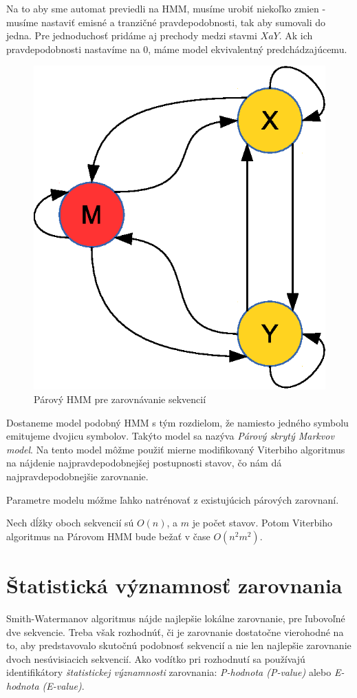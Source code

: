 Na to aby sme automat previedli na HMM, musíme urobiť niekoľko zmien - musíme nastaviť emisné a tranzičné pravdepodobnosti, tak aby sumovali do jedna. Pre jednoduchosť pridáme aj prechody medzi stavmi $X a Y$. Ak ich pravdepodobnosti nastavíme na 0, máme model ekvivalentný predchádzajúcemu.

\begin{figure}[htp]
    \centering
    \includegraphics[width=.4\textwidth]{images/simple_model}
    \caption{Párový HMM pre zarovnávanie sekvencií}
    \label{fig:simple-model}
\end{figure}

Dostaneme model podobný HMM s tým rozdielom, že namiesto jedného symbolu emitujeme dvojicu symbolov. Takýto model sa nazýva \textit{Párový skrytý Markvov model}. Na tento model môžme použiť mierne modifikovaný Viterbiho algoritmus na nájdenie najpravdepodobnejšej postupnosti stavov, čo nám dá najpravdepodobnejšie zarovnanie.

Parametre modelu móžme ľahko natrénovať z existujúcich párových zarovnaní.

Nech dĺžky oboch sekvencií sú $O(n)$, a $m$ je počet stavov. Potom Viterbiho algoritmus na Párovom HMM bude bežať v čase $O(n^2m^2)$.
\cite{durbin}

\section[Štat. významnosť ]{Štatistická významnosť zarovnania}
Smith-Watermanov algoritmus nájde najlepšie lokálne zarovnanie, pre ľubovoľné dve sekvencie. Treba však rozhodnúť, či je zarovnanie dostatočne vierohodné na to, aby predstavovalo skutočnú podobnosť sekvencií a nie len najlepšie zarovnanie dvoch nesúvisiacich sekvencií.
Ako vodítko pri rozhodnutí sa používajú identifikátory \textit{štatistickej významnosti} zarovnania: \textit{P-hodnota (P-value)} alebo \textit{E-hodnota (E-value)}.

